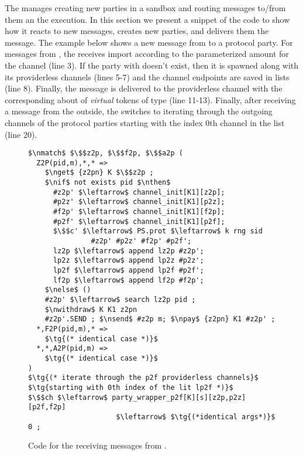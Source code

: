 The \partywrapper manages creating new parties in a sandbox and routing messages to/from them an the execution. 
In this section we present a snippet of the \partywrapper code to show how it reacts to new messages, creates new parties, and delivers them the message.
The example below shows a new message from \Z to a protocol party. 
For messages from \Z, the \partywrapper receives import according to the parameterized amount for the  channel (line 3).
If the party with  doesn't exist, then it is spawned along with its providerless channels (lines 5-7) and the channel endpoints are saved in lists (line 8).  
Finally, the message is delivered to the providerless channel with the corresponding about of \emph{virtual} tokens of type  (line 11-13). 
Finally, after receiving a message from the outside, the \partywrapper switches to iterating through the outgoing channels of the protocol parties starting with the index 0th channel in the  list (line 20).

\begin{figure}[h]
	\centering
	\begin{lstlisting}[basicstyle=\footnotesize\BeraMonottFamily, mathescape, frame=single]
$\nmatch$ $\$$z2p, $\$$f2p, $\$$a2p (
  Z2P(pid,m),*,* =>
    $\nget$ {z2pn} K $\$$z2p ;
    $\nif$ not exists pid $\nthen$
      #z2p' $\leftarrow$ channel_init[K1][z2p]; 
      #p2z' $\leftarrow$ channel_init[K1][p2z];
      #f2p' $\leftarrow$ channel_init[K1][f2p]; 
      #p2f' $\leftarrow$ channel_init[K1][p2f];
      $\$$c' $\leftarrow$ PS.prot $\leftarrow$ k rng sid 
               #z2p' #p2z' #f2p' #p2f';
      lz2p $\leftarrow$ append lz2p #z2p'; 
      lp2z $\leftarrow$ append lp2z #p2z';
      lp2f $\leftarrow$ append lp2f #p2f'; 
      lf2p $\leftarrow$ append lf2p #f2p';
    $\nelse$ ()
    #z2p' $\leftarrow$ search lz2p pid ;
    $\nwithdraw$ K K1 z2pn
    #z2p'.SEND ; $\nsend$ #z2p m; $\npay$ {z2pn} K1 #z2p' ;
  *,F2P(pid,m),* =>
    $\tg{(* identical case *)}$
  *,*,A2P(pid,m) =>
    $\tg{(* identical case *)}$
)
$\tg{(* iterate through the p2f providerless channels}$
$\tg{starting with 0th index of the lit lp2f *)}$
$\$$ch $\leftarrow$ party_wrapper_p2f[K][s][z2p,p2z][p2f,f2p] 
                     $\leftarrow$ $\tg{(*identical args*)}$ 0 ;
	\end{lstlisting}
\caption{Code for the \partywrapper receiving messages from \Z.}
\label{lst:partywrapper}
\end{figure}

